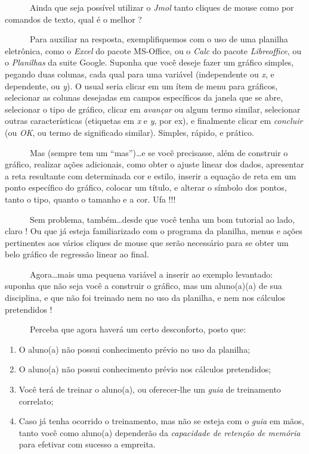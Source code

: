 \documentclass[
  letterpaper,
  DIV=11,
  numbers=noendperiod]{scrreprt}
\providecommand{\tightlist}{%
  \setlength{\itemsep}{0pt}\setlength{\parskip}{0pt}}\usepackage{longtable,booktabs,array}
\begin{document}
~~~~~~Ainda que seja possível utilizar o \emph{Jmol} tanto cliques de
mouse como por comandos de texto, qual é o melhor ?

~~~~~~Para auxiliar na resposta, exemplifiquemos com o uso de uma
planilha eletrônica, como o \emph{Excel} do pacote MS-Office, ou o
\emph{Calc} do pacote \emph{Libreoffice}, ou o \emph{Planilhas} da suite
Google. Suponha que você deseje fazer um gráfico simples, pegando duas
colunas, cada qual para uma variável (independente ou \emph{x}, e
dependente, ou \emph{y}). O usual seria clicar em um ítem de menu para
gráficos, selecionar as colunas desejadas em campos específicos da
janela que se abre, selecionar o tipo de gráfico, clicar em
\emph{avançar} ou algum termo similar, selecionar outras características
(etiquetas em \emph{x} e \emph{y}, por ex), e finalmente clicar em
\emph{concluir} (ou \emph{OK}, ou termo de significado similar).
Simples, rápido, e prático.

~~~~~~Mas (sempre tem um ``mas'')\ldots e se você precisasse, além de
construir o gráfico, realizar ações adicionais, como obter o ajuste
linear dos dados, apresentar a reta resultante com determinada cor e
estilo, inserir a equação de reta em um ponto específico do gráfico,
colocar um título, e alterar o símbolo dos pontos, tanto o tipo, quanto
o tamanho e a cor. Ufa !!!

~~~~~~Sem problema, também\ldots desde que você tenha um bom tutorial ao
lado, claro ! Ou que já esteja familiarizado com o programa da planilha,
menus e ações pertinentes aos vários cliques de mouse que serão
necessário para se obter um belo gráfico de regressão linear ao final.

~~~~~~Agora\ldots mais uma pequena variável a inserir ao exemplo
levantado: suponha que não seja você a construir o gráfico, mas um
aluno(a)(a) de sua disciplina, e que não foi treinado nem no uso da
planilha, e nem nos cálculos pretendidos !

~~~~~~Perceba que agora haverá um certo desconforto, posto que:

\begin{enumerate}
\def\labelenumi{\arabic{enumi}.}
\tightlist
\item
  O aluno(a) não possui conhecimento prévio no uso da planilha;
\item
  O aluno(a) não possui conhecimento prévio nos cálculos pretendidos;
\item
  Você terá de treinar o aluno(a), ou oferecer-lhe um \emph{guia} de
  treinamento correlato;
\item
  Caso já tenha ocorrido o treinamento, mas não se esteja com o
  \emph{guia} em mãos, tanto você como aluno(a) dependerão da
  \emph{capacidade de retenção de memória} para efetivar com sucesso a
  empreita.
\end{enumerate}
\end{document}
